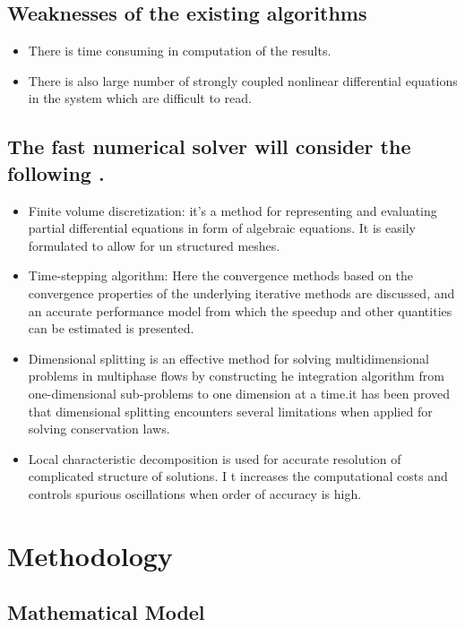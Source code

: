 \documentclass[a4paper,12pt]{article}
\begin{document}
\subsection{Weaknesses of the existing algorithms}
\begin{itemize}
\item{There is time consuming in computation of the results.}
\item{There is also large number of strongly coupled  nonlinear  differential equations in the system which are difficult to read.}
\end{itemize}
\subsection{The fast numerical solver will consider the following .}

\begin{itemize}
\item{Finite volume discretization: it’s a method for representing and evaluating partial differential equations in form of algebraic equations. It is easily formulated to allow for un structured meshes.}
\item{Time-stepping algorithm: Here the convergence methods based on the convergence properties of the underlying iterative methods are discussed, and an accurate performance model from which the speedup and other quantities can be estimated is presented.}
\item{Dimensional splitting is an effective method for solving multidimensional problems  in multiphase flows by constructing he integration algorithm from one-dimensional sub-problems to one  dimension at a time.it has been proved that dimensional splitting encounters several limitations when applied for solving conservation laws.}
\item{Local characteristic decomposition is used for accurate resolution of complicated structure of solutions. I t increases the computational costs and controls spurious oscillations when order of accuracy is high.}
\end{itemize}

\section{Methodology}
	
\subsection{Mathematical Model}
\end{document}
